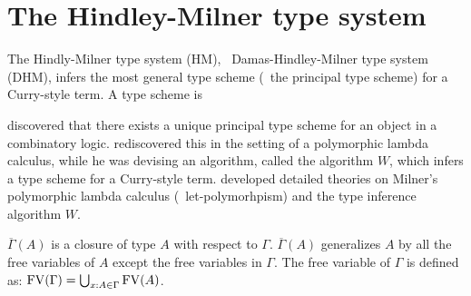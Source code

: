 \section{The Hindley-Milner type system} \label{sec:hm}

The Hindly-Milner type system (HM),
\aka\ Damas-Hindley-Milner type system (DHM),
\cite{Hindley69,Milner78,DamMil82,Damas85} infers the most general type scheme
(\aka\ the principal type scheme) for a Curry-style term.
A type scheme is

\citet{Hindley69} discovered that there exists a unique principal type scheme
for an object in a combinatory logic. \citet{Milner78} rediscovered this
in the setting of a polymorphic lambda calculus, while he was devising
an algorithm, called the algorithm $W$, which infers a type scheme for
a Curry-style term. \citet{Damas85} developed detailed theories on
Milner's polymorphic lambda calculus (\aka\ let-polymorhpism) and
the type inference algorithm $W$.

$\overline{\Gamma}(A)$ is a closure of type $A$ with respect to $\Gamma$.
$\overline{\Gamma}(A)$ generalizes $A$ by all the free variables of $A$
except the free variables in $\Gamma$. The free variable of $\Gamma$ is
defined as: $\mathop{\mathrm{FV}}(\Gamma) = \bigcup_{x:A\in \Gamma} \mathop{\mathrm{FV}}(A)$.

